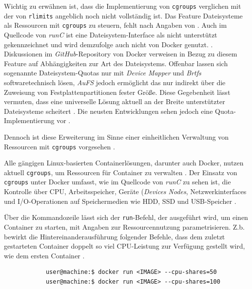 \documentclass[../main.tex]{subfiles}
\begin{document}
		Wichtig zu erwähnen ist, dass die Implementierung von \texttt{\acrshort{cgroups}} verglichen mit der von \texttt{\acrshort{rlimits}} angeblich noch nicht vollständig ist. Das Feature Dateisysteme als Ressourcen mit \texttt{\acrshort{cgroups}} zu steuern, fehlt nach Angaben von \cite[S.19]{dockerSec2}. Auch im Quellcode von \emph{runC} ist eine Dateisystem-Interface als \glqq{}nicht unterstützt\grqq{} gekennzeichnet und wird demzufolge auch nicht von Docker genutzt. \cite{githubRunCCgroups}. Diskussionen im \emph{GitHub}-Repository von Docker verweisen in Bezug zu diesem Feature auf Abhängigkeiten zur Art des Dateisystems. Offenbar lassen sich sogenannte Dateisystem-Quotas nur mit \emph{Device Mapper} und \emph{Brtfs} softwaretechnisch lösen, \emph{AuFS} jedoch ermöglicht das nur indirekt über die Zuweisung von Festplattenpartitionen fester Größe. Diese Gegebenheit lässt vermuten, dass eine universelle Lösung aktuell an der Breite unterstützter Dateisysteme scheitert \cite{githubDockerIssueFsQuota}. Die neusten Entwicklungen sehen jedoch eine Quota-Implementierung vor \cite{githubDockerPullBrtfs}.

		Dennoch ist diese Erweiterung im Sinne einer einheitlichen Verwaltung von Ressourcen mit \texttt{\acrshort{cgroups}} vorgesehen \cite[S.16+19]{dockerSec2}.

		Alle gängigen Linux-basierten Containerlösungen, darunter auch Docker, nutzen aktuell \texttt{\acrshort{cgroups}}, um Ressourcen für Container zu verwalten \cite[S.16]{dockerSec2}. Der Einsatz von \texttt{\acrshort{cgroups}} unter Docker umfasst, wie im Quellcode von \emph{runC} zu sehen ist, die Kontrolle über \acrshort{CPU}, Arbeitsspeicher, Geräte (\emph{Devices Nodes}, Netzwerkinterfaces und \acrshort{I/O}-Operationen auf Speichermedien wie \acrshort{HDD}, \acrshort{SSD} und \acrshort{USB}-Speicher \cite{cgroupsRedhat}\cite{githubRunCCgroups}.

		Über die Kommandozeile lässt sich der \texttt{run}-Befehl, der ausgeführt wird, um einen Container zu starten, mit Angaben zur Ressourcennutzung parametrisieren. Z.b. bewirkt die Hintereinanderausführung folgender Befehle, dass dem zuletzt gestarteten Container doppelt so viel CPU-Leistung zur Verfügung gestellt wird, wie dem ersten Container \cite{dockerRun}.

		\begin{lstlisting}
			user@machine:$ docker run <IMAGE> --cpu-shares=50
			user@machine:$ docker run <IMAGE> --cpu-shares=100
		\end{lstlisting}
\end{document}

